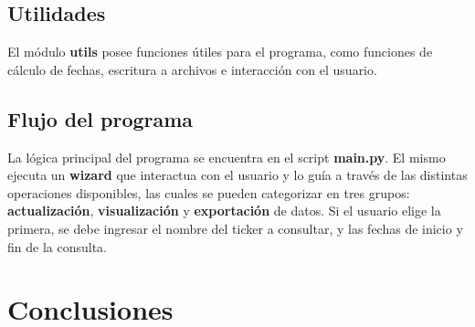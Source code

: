 \documentclass{article}
\begin{document}
\subsection{Utilidades}
El módulo \textbf{utils} posee funciones útiles para el programa, como funciones de cálculo de
fechas, escritura a archivos e interacción con el usuario.

\subsection{Flujo del programa}
La lógica principal del programa se encuentra en el script \textbf{main.py}. El mismo ejecuta
un \textbf{wizard} que interactua con el usuario y lo guía a través de las distintas operaciones
disponibles, las cuales se pueden categorizar en tres grupos: \textbf{actualización},
\textbf{visualización} y \textbf{exportación} de datos.
Si el usuario elige la primera, se debe ingresar el nombre del ticker a consultar, y las fechas
de inicio y fin de la consulta.

\section{Conclusiones}



\end{document}
